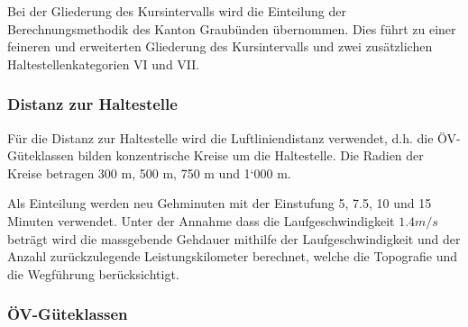 Bei der Gliederung des Kursintervalls wird die Einteilung der Berechnungsmethodik des Kanton Graubünden übernommen.
Dies führt zu einer feineren und erweiterten Gliederung des Kursintervalls und zwei zusätzlichen Haltestellenkategorien VI und VII.

\subsubsection{Distanz zur Haltestelle}
\label{Zusammenhang zur Berechnungsmethodik ARE:Distanz zur Haltestelle}

\begin{itquote}
Für die Distanz zur Haltestelle wird die Luftliniendistanz verwendet, d.h. die ÖV-Güteklassen bilden konzentrische Kreise um die Haltestelle.
Die Radien der Kreise betragen 300 m, 500 m, 750 m und 1‘000 m.
\end{itquote}

Als Einteilung werden neu Gehminuten mit der Einstufung 5, 7.5, 10 und 15 Minuten verwendet.
Unter der Annahme dass die Laufgeschwindigkeit $1.4 m/s$ beträgt wird die massgebende Gehdauer mithilfe der Laufgeschwindigkeit und der Anzahl zurückzulegende \gls{Leistungskilometer} berechnet, welche die Topografie und die Wegführung berücksichtigt. 

\subsubsection{ÖV-Güteklassen}
\label{Zusammenhang zur Berechnungsmethodik ARE:ÖV-Güteklassen}

